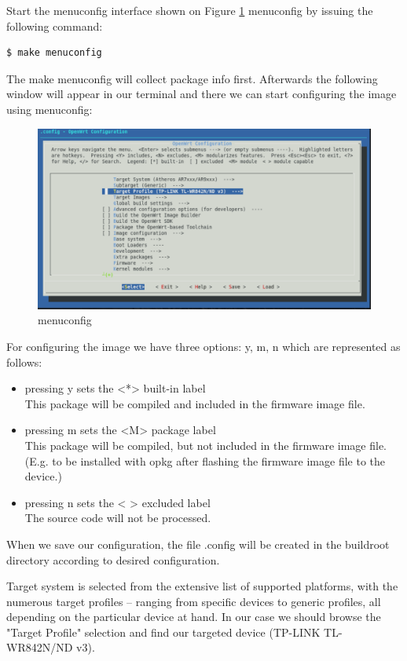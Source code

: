 Start the menuconfig interface shown on Figure \ref{fig_menuconfig} menuconfig by issuing the following command:
\begin{lstlisting}[columns=fixed,basicstyle=\ttfamily\footnotesize,tabsize=4,backgroundcolor=\color{yellow!10}]
$ make menuconfig
\end{lstlisting}
The make menuconfig will collect package info first.
Afterwards the following window will appear in our terminal and there we can start configuring the image using menuconfig:
\begin{figure}[h]
    \centering
    \includegraphics[scale=0.6]{figures/make_menuconfig.pdf}
    \caption{menuconfig}
    \label{fig_menuconfig}
\end{figure}

For configuring the image we have three options: y, m, n which are represented as follows:
\begin{itemize}
\item pressing y sets the <*> built-in label\\
This package will be compiled and included in the firmware image file.
\item pressing m sets the <M> package label\\
This package will be compiled, but not included in the firmware image file. (E.g. to be installed with opkg after flashing the firmware image file to the device.)
\item pressing n sets the < > excluded label\\
The source code will not be processed.
\end{itemize}
When we save our configuration, the file .config will be created in the buildroot directory according to desired configuration.

Target system is selected from the extensive list of supported platforms, with the numerous target profiles – ranging from specific devices to generic profiles, all depending on the particular device at hand.
In our case we should browse the "Target Profile" selection and find our targeted device (TP-LINK TL-WR842N/ND v3).

